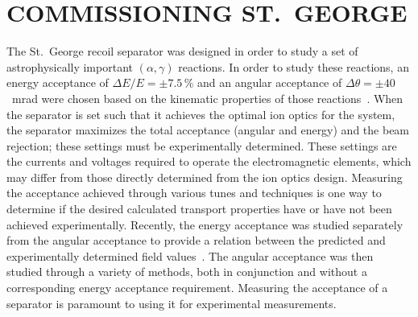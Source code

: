 \chapter{COMMISSIONING ST.\ GEORGE}

The St.\ George recoil separator was designed in order to study a set of
astrophysically important $(\alpha,\gamma)$ reactions. In order to study
these reactions, an energy acceptance of $\Delta E/E = \pm7.5$\,\% and
an angular acceptance of $\Delta\theta = \pm40$~mrad were chosen based
on the kinematic properties of those reactions~\cite{Couder2008}. When
the separator is set such that it achieves the optimal ion optics for
the system, the separator maximizes the total acceptance (angular and
energy) and the beam rejection; these settings must be experimentally
determined. These settings are the currents and voltages required to
operate the electromagnetic elements, which may differ from those
directly determined from the ion optics design. Measuring the acceptance
achieved through various tunes and techniques is one way to determine if
the desired calculated transport properties have or have not been
achieved experimentally. Recently, the energy acceptance was studied
separately from the angular acceptance to provide a relation between the
predicted and experimentally determined field values~\cite{Meisel2017}.
The angular acceptance was then studied through a variety of methods,
both in conjunction and without a corresponding energy acceptance
requirement. Measuring the acceptance of a separator is paramount to
using it for experimental measurements.

